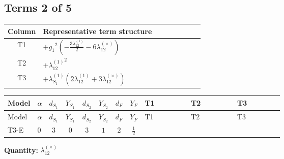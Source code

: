\documentclass[8pt]{article}
\begin{document}
\begin{landscape}
\subsection*{Terms 2 of 5}
\begin{center}
\begin{tabular}{@{}c >{\raggedright\arraybackslash}p{0.82\linewidth}@{}}
\toprule
Column & Representative term structure \\
\midrule
T1 & \(\displaystyle +{g_1}^2 \left(-\frac{3 {\lambda_{12}^{(1)}}}{2}-6 {\lambda_{12}^{(\times)}}\right)\) \\
\midrule
T2 & \(\displaystyle +{\lambda_{12}^{(1)}}^2\) \\
\midrule
T3 & \(\displaystyle +{\lambda_{S_1}^{(1)}} (2 {\lambda_{12}^{(1)}}+3 {\lambda_{12}^{(\times)}})\) \\
\midrule
\bottomrule
\end{tabular}
\end{center}
\smallskip
\tiny
\begin{longtable}{@{}llcccccc >{\raggedright\arraybackslash}p{0.21\linewidth} >{\raggedright\arraybackslash}p{0.21\linewidth} >{\raggedright\arraybackslash}p{0.21\linewidth}@{}}
\toprule
Model & $\alpha$ & $d_{S_1}$ & $Y_{S_1}$ & $d_{S_2}$ & $Y_{S_2}$ & $d_F$ & $Y_F$ & T1 & T2 & T3 \\
\midrule
\endfirsthead
\toprule
Model & $\alpha$ & $d_{S_1}$ & $Y_{S_1}$ & $d_{S_2}$ & $Y_{S_2}$ & $d_F$ & $Y_F$ & T1 & T2 & T3 \\
\midrule
\endhead
T3-E & $0$ & $3$ & $0$ & $3$ & $1$ & $2$ & $\frac{1}{2}$ & \scriptsize\adjustbox{max width=\linewidth}{$\begin{gathered} +{g_1}^2 \left(-\frac{3 {\lambda_{12}^{(1)}}}{2}-6 {\lambda_{12}^{(\times)}}\right)\end{gathered}$} & \scriptsize\adjustbox{max width=\linewidth}{$\begin{gathered} +{\lambda_{12}^{(1)}}^2\end{gathered}$} & \scriptsize\adjustbox{max width=\linewidth}{$\begin{gathered} +{\lambda_{S_1}^{(1)}} (2 {\lambda_{12}^{(1)}}+3 {\lambda_{12}^{(\times)}})\end{gathered}$} \\
\midrule
\bottomrule
\end{longtable}
\clearpage
\noindent\textbf{Quantity: }$\lambda_{12}^{(\times)}$\par\smallskip

\end{landscape}
\end{document}
